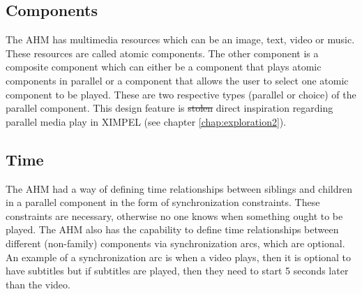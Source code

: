 \subsection{Components}
The AHM has multimedia resources which can be an image, text, video or music. These resources are called atomic components. The other component is a composite component which can either be a component that plays atomic components in parallel or a component that allows the user to select one atomic component to be played. These are two respective types (parallel or choice) of the parallel component. This design feature is \sout{stolen} direct inspiration regarding parallel media play in XIMPEL (see chapter \ref{chap:exploration2}).



\subsection{Time}
The AHM had a way of defining time relationships between siblings and children in a parallel component in the form of synchronization constraints. These constraints are necessary, otherwise no one knows when something ought to be played. The AHM also has the capability to define time relationships between different (non-family) components via synchronization arcs, which are optional. An example of a synchronization arc is when a video plays, then it is optional to have subtitles but if subtitles are played, then they need to start 5 seconds later than the video.



